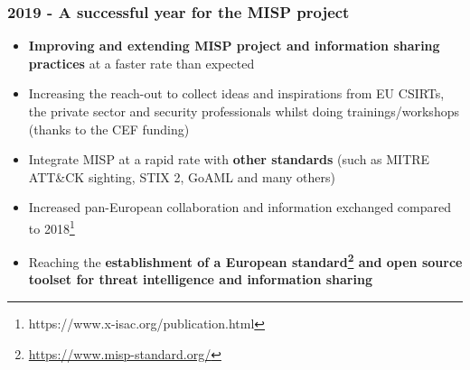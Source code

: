 
\begin{frame}[t,plain]
\titlepage
\end{frame}

\begin{frame}
        \frametitle{2019 - A successful year for the MISP project}
\begin{itemize}
        \item {\bf Improving and extending MISP project and information sharing practices} at a faster rate than expected
        \item Increasing the reach-out to collect ideas and inspirations from EU CSIRTs, the private sector and security professionals whilst doing trainings/workshops (thanks to the CEF funding)
        \item Integrate MISP at a rapid rate with {\bf other standards} (such as MITRE ATT\&CK sighting, STIX 2, GoAML and many others)
        \item Increased pan-European collaboration and information exchanged compared to 2018\footnote{https://www.x-isac.org/publication.html}
        \item Reaching the {\bf establishment of a European standard\footnote{\url{https://www.misp-standard.org/}} and open source toolset for threat intelligence and information sharing}
\end{itemize}
\end{frame}

